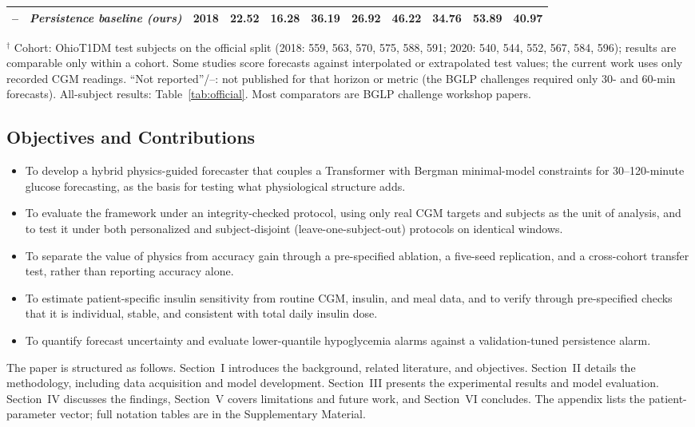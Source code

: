 \documentclass[journal]{IEEEtran}
\begin{document}
\begin{table}[t]
{\begin{tabular}{l>{\raggedright\arraybackslash}p{2.6cm}crrrrrrrr}
-- & \emph{Persistence baseline (ours)} & 2018 & 22.52 & 16.28 & 36.19 & 26.92 & 46.22 & 34.76 & 53.89 & 40.97 \\
\bottomrule
\end{tabular}%
}
\vspace{2pt}
\raggedright\footnotesize
$^{\dagger}$ Cohort: OhioT1DM test subjects on the official split (2018: 559, 563, 570, 575, 588, 591; 2020: 540, 544, 552, 567, 584, 596); results are comparable only within a cohort. Some studies score forecasts against interpolated or extrapolated test values; the current work uses only recorded CGM readings. ``Not reported''/--: not published for that horizon or metric (the BGLP challenges required only 30- and 60-min forecasts). All-subject results: Table~\ref{tab:official}. Most comparators are BGLP challenge workshop papers.
\end{table}
 


\subsection{Objectives and Contributions}
\begin{itemize}
\sloppy
\item To develop a hybrid physics-guided forecaster that couples a Transformer with Bergman minimal-model constraints for 30--120-minute glucose forecasting, as the basis for testing what physiological structure adds.
\item To evaluate the framework under an integrity-checked protocol, using only real CGM targets and subjects as the unit of analysis, and to test it under both personalized and subject-disjoint (leave-one-subject-out) protocols on identical windows.
\item To separate the value of physics from accuracy gain through a pre-specified ablation, a five-seed replication, and a cross-cohort transfer test, rather than reporting accuracy alone.
\item To estimate patient-specific insulin sensitivity from routine CGM, insulin, and meal data, and to verify through pre-specified checks that it is individual, stable, and consistent with total daily insulin dose.
\item To quantify forecast uncertainty and evaluate lower-quantile hypoglycemia alarms against a validation-tuned persistence alarm.
\end{itemize}

The paper is structured as follows. Section~I introduces the background, related literature, and objectives. Section~II details the methodology, including data acquisition and model development. Section~III presents the experimental results and model evaluation. Section~IV discusses the findings, Section~V covers limitations and future work, and Section~VI concludes. The appendix lists the patient-parameter vector; full notation tables are in the Supplementary Material.
\end{document}
